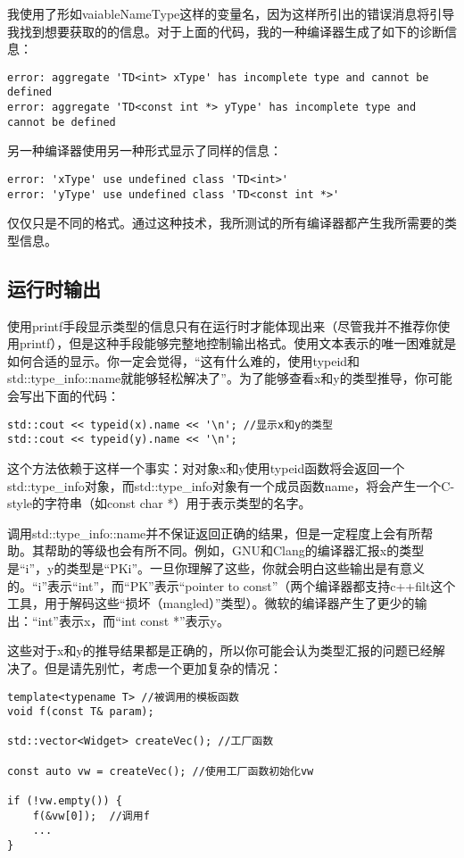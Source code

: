我使用了形如vaiableNameType这样的变量名，因为这样所引出的错误消息将引导我找到想要获取的的信息。对于上面的代码，我的一种编译器生成了如下的诊断信息：

\begin{lstlisting}
error: aggregate 'TD<int> xType' has incomplete type and cannot be defined
error: aggregate 'TD<const int *> yType' has incomplete type and cannot be defined
\end{lstlisting}

另一种编译器使用另一种形式显示了同样的信息：

\begin{lstlisting}
error: 'xType' use undefined class 'TD<int>'
error: 'yType' use undefined class 'TD<const int *>'
\end{lstlisting}

仅仅只是不同的格式。通过这种技术，我所测试的所有编译器都产生我所需要的类型信息。

\subsection{运行时输出}
使用printf手段显示类型的信息只有在运行时才能体现出来（尽管我并不推荐你使用printf），但是这种手段能够完整地控制输出格式。使用文本表示的唯一困难就是如何合适的显示。你一定会觉得，“这有什么难的，使用typeid和std::type\_info::name就能够轻松解决了”。为了能够查看x和y的类型推导，你可能会写出下面的代码：

\begin{lstlisting}
std::cout << typeid(x).name << '\n'; //显示x和y的类型
std::cout << typeid(y).name << '\n';
\end{lstlisting}

这个方法依赖于这样一个事实：对对象x和y使用typeid函数将会返回一个std::type\_info对象，而std::type\_info对象有一个成员函数name，将会产生一个C-style的字符串（如const char *）用于表示类型的名字。

调用std::type\_info::name并不保证返回正确的结果，但是一定程度上会有所帮助。其帮助的等级也会有所不同。例如，GNU和Clang的编译器汇报x的类型是“i”，y的类型是“PKi”。一旦你理解了这些，你就会明白这些输出是有意义的。“i”表示“int”，而“PK”表示“pointer to const”（两个编译器都支持c++filt这个工具，用于解码这些“损坏（mangled）”类型）。微软的编译器产生了更少的输出：“int”表示x，而“int const *”表示y。

这些对于x和y的推导结果都是正确的，所以你可能会认为类型汇报的问题已经解决了。但是请先别忙，考虑一个更加复杂的情况：

\begin{lstlisting}
template<typename T> //被调用的模板函数
void f(const T& param);

std::vector<Widget> createVec(); //工厂函数

const auto vw = createVec(); //使用工厂函数初始化vw

if (!vw.empty()) {
	f(&vw[0]);	//调用f
	...
}
\end{lstlisting}

